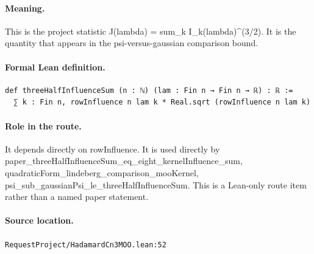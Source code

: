 \medskip
\paragraph{Meaning.}
This is the project statistic J(lambda) = sum\_k I\_k(lambda)^(3/2). It is the quantity that appears in the psi-versus-gaussian comparison bound.
\paragraph{Formal Lean definition.}
\begin{verbatim}
def threeHalfInfluenceSum (n : ℕ) (lam : Fin n → Fin n → ℝ) : ℝ :=
  ∑ k : Fin n, rowInfluence n lam k * Real.sqrt (rowInfluence n lam k)
\end{verbatim}
\paragraph{Role in the route.}
It depends directly on rowInfluence. It is used directly by paper\_threeHalfInfluenceSum\_eq\_eight\_kernelInfluence\_sum, quadraticForm\_lindeberg\_comparison\_mooKernel, psi\_sub\_gaussianPsi\_le\_threeHalfInfluenceSum. This is a Lean-only route item rather than a named paper statement.
\paragraph{Source location.}
\texttt{RequestProject/HadamardCn3MOO.lean:52}
\medskip
